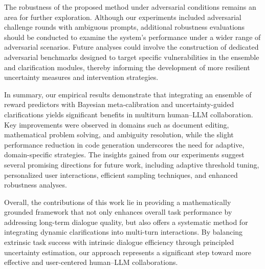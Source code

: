 \documentclass{article}
\begin{document}
The robustness of the proposed method under adversarial conditions remains an area for further exploration. Although our experiments included adversarial challenge rounds with ambiguous prompts, additional robustness evaluations should be conducted to examine the system's performance under a wider range of adversarial scenarios. Future analyses could involve the construction of dedicated adversarial benchmarks designed to target specific vulnerabilities in the ensemble and clarification modules, thereby informing the development of more resilient uncertainty measures and intervention strategies.

In summary, our empirical results demonstrate that integrating an ensemble of reward predictors with Bayesian meta-calibration and uncertainty-guided clarifications yields significant benefits in multiturn human–LLM collaboration. Key improvements were observed in domains such as document editing, mathematical problem solving, and ambiguity resolution, while the slight performance reduction in code generation underscores the need for adaptive, domain-specific strategies. The insights gained from our experiments suggest several promising directions for future work, including adaptive threshold tuning, personalized user interactions, efficient sampling techniques, and enhanced robustness analyses.

Overall, the contributions of this work lie in providing a mathematically grounded framework that not only enhances overall task performance by addressing long-term dialogue quality, but also offers a systematic method for integrating dynamic clarifications into multi-turn interactions. By balancing extrinsic task success with intrinsic dialogue efficiency through principled uncertainty estimation, our approach represents a significant step toward more effective and user-centered human–LLM collaborations.
\end{document}
